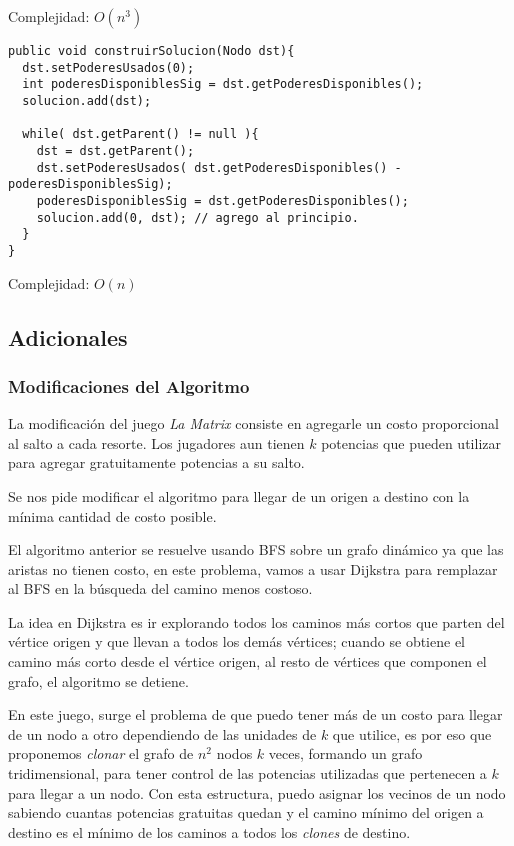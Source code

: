 Complejidad: $O(n^3)$

\footnotesize\begin{verbatim}
public void construirSolucion(Nodo dst){
  dst.setPoderesUsados(0);
  int poderesDisponiblesSig = dst.getPoderesDisponibles();
  solucion.add(dst);

  while( dst.getParent() != null ){
    dst = dst.getParent();
    dst.setPoderesUsados( dst.getPoderesDisponibles() - poderesDisponiblesSig);
    poderesDisponiblesSig = dst.getPoderesDisponibles();
    solucion.add(0, dst); // agrego al principio. 
  }
}
\end{verbatim}\normalsize

Complejidad: $O(n)$

\subsection{Adicionales}

\subsubsection{Modificaciones del Algoritmo}
La modificaci\'on del juego \textit{La Matrix} consiste en agregarle un costo proporcional al salto a cada resorte. Los jugadores aun tienen $k$ potencias que pueden utilizar para agregar gratuitamente potencias a su salto.

Se nos pide modificar el algoritmo para llegar de un origen a destino con la m\'inima cantidad de costo posible.

El algoritmo anterior se resuelve usando BFS sobre un grafo din\'amico ya que las aristas no tienen costo, en este problema, vamos a usar Dijkstra para remplazar al BFS en la b\'usqueda del camino menos costoso.

La idea en Dijkstra es ir explorando todos los caminos m\'as cortos que parten del v\'ertice origen y que llevan a todos los dem\'as v\'ertices; cuando se obtiene el camino m\'as corto desde el v\'ertice origen, al resto de v\'ertices que componen el grafo, el algoritmo se detiene.

En este juego, surge el problema de que puedo tener m\'as de un costo para llegar de un nodo a otro dependiendo de las unidades de $k$ que utilice, es por eso que proponemos \textit{clonar} el grafo de $n^2$ nodos $k$ veces, formando un grafo tridimensional, para tener control de las potencias utilizadas que pertenecen a $k$ para llegar a un nodo. Con esta estructura, puedo asignar los vecinos de un nodo sabiendo cuantas potencias gratuitas quedan y el camino m\'inimo del origen a destino es el m\'inimo de los caminos a todos los \textit{clones} de destino.

